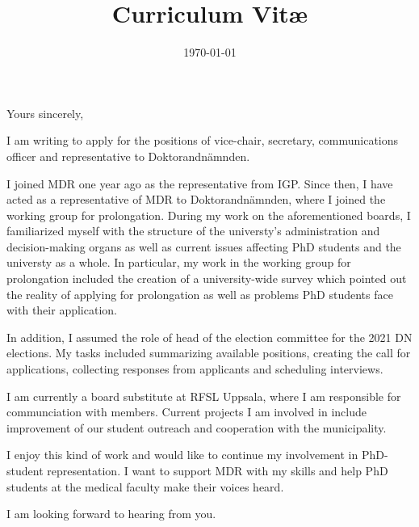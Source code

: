 \documentclass[11pt,a4paper,sans]{moderncv} %
\title{Curriculum Vit\ae{}}
\begin{document}
	
	
	\ifdefined\showletter
	\clearpage
	\vspace*{-2cm}
	\date{\today} %
	\opening{} %
	\closing{Yours sincerely,} %
	
	\makelettertitle %
	\justify
	\thispagestyle{empty}
	\enlargethispage{45pt}
	\vspace{-20pt}
	I am writing to apply for the positions of vice-chair, secretary, communications officer and representative to Doktorandnämnden.
	
	I joined MDR one year ago as the representative from IGP.
	Since then, I have acted as a representative of MDR to Doktorandnämnden, where I joined the working group for prolongation.
	During my work on the aforementioned boards, I familiarized myself with the structure of the universty's administration and decision-making organs as well as current issues affecting PhD students and the universty as a whole.
	In particular, my work in the working group for prolongation included the creation of a university-wide survey which pointed out the reality of applying for prolongation as well as problems PhD students face with their application.

	In addition, I assumed the role of head of the election committee for the 2021 DN elections.
	My tasks included summarizing available positions, creating the call for applications, collecting responses from applicants and scheduling interviews.

	I am currently a board substitute at RFSL Uppsala, where
	I am responsible for communciation with members.
	Current projects I am involved in include improvement of our student outreach and cooperation with the municipality.
	
	I enjoy this kind of work and would like to continue my involvement in PhD-student representation.
	I want to support MDR with my skills and help PhD students at the medical faculty make their voices heard.

	I am looking forward to hearing from you.
	
	\makeletterclosing %
\end{document}
